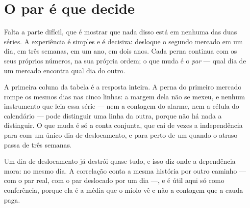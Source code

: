 \section{O par é que decide}

Falta a parte difícil, que é mostrar que nada disso está em nenhuma das duas séries. A
experiência é simples e é decisiva: desloque o segundo mercado em um dia, em três semanas, em
um ano, em dois anos. Cada perna continua com os seus próprios números, na sua própria ordem;
o que muda é o \emph{par} --- qual dia de um mercado encontra qual dia do outro.

\begin{table}[htbp]
  \centering
  \caption{A mesma série, com o par trocado. A coluna da esquerda é a que importa: a
    primeira perna rompe os mesmos \numDependenciaRompeA{} dias em todas as linhas, porque a
    série dela não foi tocada. O pareamento é a única coisa que mudou.}
  \label{tab:par}
\end{table}

A primeira coluna da tabela é a resposta inteira. A perna do primeiro mercado rompe os mesmos
\numDependenciaRompeA{} dias nas cinco linhas: a margem dela não se mexeu, e nenhum instrumento
que leia essa série --- nem a contagem do alarme, nem a célula do calendário --- pode
distinguir uma linha da outra, porque não há nada a distinguir. O que muda é só a conta
conjunta, que cai de \numDependenciaExcesso{} vezes a independência para
\numDependenciaAtrasoUmDiaExcesso{} com um único dia de deslocamento, e para perto de um quando
o atraso passa de três semanas.

Um dia de deslocamento já destrói quase tudo, e isso diz onde a dependência mora: no mesmo dia.
A correlação conta a mesma história por outro caminho --- \numDependenciaCorrelacao{} com o par
real, \numDependenciaAtrasoUmDiaCorrelacao{} com o par deslocado por um dia ---, e é útil aqui
só como conferência, porque ela é a média que o miolo vê e não a contagem que a cauda paga.

